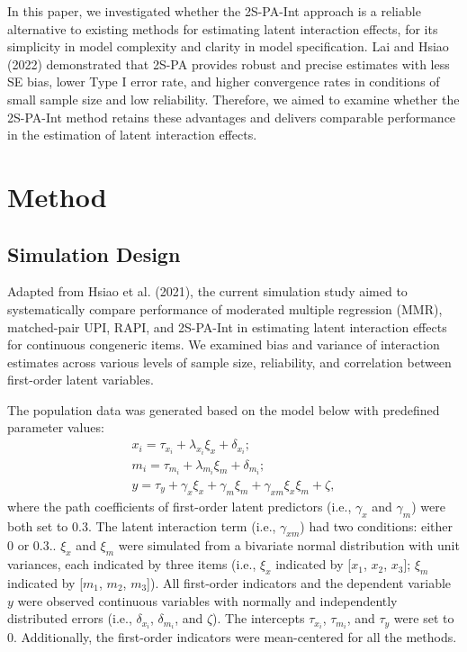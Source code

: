 \documentclass[
  man,mask]{apa6}
\begin{document}
In this paper, we investigated whether the 2S-PA-Int approach is a reliable alternative to existing methods for estimating latent interaction effects, for its simplicity in model complexity and clarity in model specification. Lai and Hsiao (2022) demonstrated that 2S-PA provides robust and precise estimates with less SE bias, lower Type I error rate, and higher convergence rates in conditions of small sample size and low reliability. Therefore, we aimed to examine whether the 2S-PA-Int method retains these advantages and delivers comparable performance in the estimation of latent interaction effects.

\section{Method}\label{method}

\subsection{Simulation Design}\label{simulation-design}

Adapted from Hsiao et al. (2021), the current simulation study aimed to systematically compare performance of moderated multiple regression (MMR), matched-pair UPI, RAPI, and 2S-PA-Int in estimating latent interaction effects for continuous congeneric items. We examined bias and variance of interaction estimates across various levels of sample size, reliability, and correlation between first-order latent variables.

The population data was generated based on the model below with predefined parameter values:
\begin{equation}
\begin{gathered}
x_{i} =  \tau_{x_{i}} + \lambda_{x_{i}}\xi_{x} + \delta_{x_{i}};\\
m_{i} =  \tau_{m_{i}} + \lambda_{m_{i}}\xi_{m} + \delta_{m_{i}};\\
y =  \tau_{y} + \gamma_{x}\xi_{x} + \gamma_{m}\xi_{m} + \gamma_{xm}\xi_{x}\xi_{m} + \zeta,
\end{gathered}
\end{equation}
where the path coefficients of first-order latent predictors (i.e., \(\gamma_{x}\) and \(\gamma_{m}\)) were both set to 0.3. The latent interaction term (i.e., \(\gamma_{xm}\)) had two conditions: either 0 or 0.3.. \(\xi_{x}\) and \(\xi_{m}\) were simulated from a bivariate normal distribution with unit variances, each indicated by three items (i.e., \(\xi_{x}\) indicated by {[}\(x_{1}\), \(x_{2}\), \(x_{3}\){]}; \(\xi_{m}\) indicated by {[}\(m_{1}\), \(m_{2}\), \(m_{3}\){]}). All first-order indicators and the dependent variable \(y\) were observed continuous variables with normally and independently distributed errors (i.e., \(\delta_{x_{i}}\), \(\delta_{m_{i}}\), and \(\zeta\)). The intercepts \(\tau_{x_{i}}\), \(\tau_{m_{i}}\), and \(\tau_{y}\) were set to 0. Additionally, the first-order indicators were mean-centered for all the methods.
\end{document}
